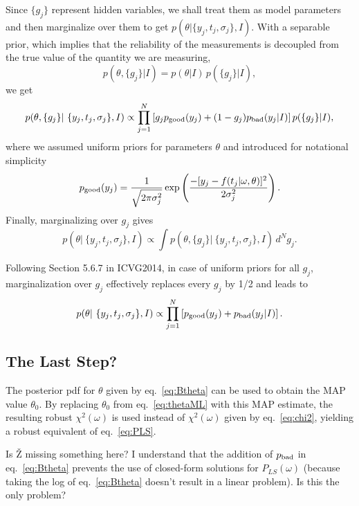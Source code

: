 \documentclass[12pt,pdftex]{article}
\begin{document}
Since $\{g_j\}$ represent hidden variables, we shall treat them as model parameters and then
marginalize over them to get $p(\theta|\{y_j, t_j, \sigma_j\} ,I)$. With a separable prior,
which implies that the reliability of the measurements is decoupled from the true value
of the quantity we are measuring,
\begin{equation}
        p(\theta,\{g_j\}|I) = p(\theta|I)  \, p(\{g_j\}|I),
\end{equation}
we get
\begin{equation}
   p(\theta,\{g_j\}|~\{y_j, t_j, \sigma_j\}, I) \propto \prod_{j=1}^{N} \left[ g_j p_{\rm good}(y_j)   + (1-g_j) p_{\rm bad}(y_j|I) \right] p(\{g_j\}|I),
\end{equation}
where we assumed uniform priors for parameters $\theta$ and introduced for notational simplicity
\begin{equation}
       p_{\rm good}(y_j) = \frac{1}{\sqrt{2\pi\sigma_j^2}} \exp\left(
                  \frac{-[y_j - f(t_j|\omega, \theta)]^2}{2\sigma_j^2}\right). 
\end{equation}
Finally, marginalizing over $g_j$ gives
\begin{equation}
  p(\theta|~\{y_j, t_j, \sigma_j\}, I) \propto \int  p(\theta,\{g_j\}|~\{y_j, t_j, \sigma_j\}, I) \, d^N g_j.
\end{equation}


Following Section 5.6.7 in ICVG2014, in case of uniform priors for all $g_j$, marginalization over
$g_j$ effectively replaces every $g_j$ by 1/2 and leads to 
\begin{equation}
\label{eq:Btheta}
   p(\theta|~\{y_j, t_j, \sigma_j\}, I) \propto \prod_{j=1}^{N} \left[ p_{\rm good}(y_j)  + p_{\rm bad}(y_j|I) \right]. 
\end{equation}



\subsection{The Last Step?}

The posterior pdf for $\theta$ given by eq.~\ref{eq:Btheta} can be used to obtain the MAP value $\theta_0$.
By replacing $\theta_0$ from eq.~\ref{eq:thetaML} with this MAP estimate, the resulting robust 
$\chi^2(\omega)$ is used instead of $\chi^2(\omega)$ given by eq.~\ref{eq:chi2}, yielding a robust equivalent
of eq.~\ref{eq:PLS}. 

Is \v{Z} missing something here? I understand that the addition of $p_{\rm bad}$ in eq.~\ref{eq:Btheta}
prevents the use of closed-form solutions for $P_{LS}(\omega)$ (because taking the log of eq.~\ref{eq:Btheta} 
doesn't result in a linear problem). Is this the only problem? 
\end{document}
